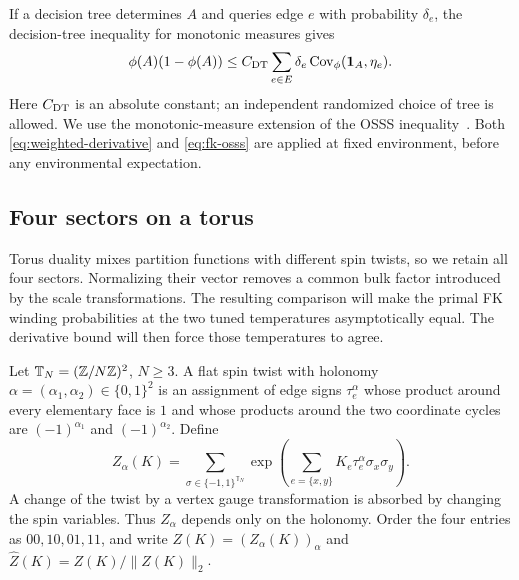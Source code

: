 If a decision tree determines $A$ and queries edge $e$ with probability
$\delta_e$, the decision-tree inequality for monotonic measures gives
\begin{equation}
 \phi(A)(1-\phi(A))
 \le C_{\rm DT}\sum_{e\in E}\delta_e\operatorname{Cov}_\phi(\mathbf 1_A,\eta_e).
 \label{eq:fk-osss}
\end{equation}
Here $C_{\rm DT}$ is an absolute constant; an independent randomized
choice of tree is allowed. We use the monotonic-measure extension
\cite[Theorem~1.1]{DCRT} of the OSSS inequality~\cite{OSSS}.
Both \eqref{eq:weighted-derivative} and \eqref{eq:fk-osss} are applied
at fixed environment, before any environmental expectation.

\subsection{Four sectors on a torus}

Torus duality mixes partition functions with different spin twists,
so we retain all four sectors. Normalizing their vector removes a
common bulk factor introduced by the scale transformations. The
resulting comparison will make the primal FK winding probabilities
at the two tuned temperatures asymptotically equal. The derivative bound will
then force those temperatures to agree.

Let $\mathbb T_N=(\mathbb Z/N\mathbb Z)^2$, $N\ge3$. A flat spin twist with
holonomy $\alpha=(\alpha_1,\alpha_2)\in\{0,1\}^2$ is an assignment
of edge signs $\tau_e^\alpha$ whose product around every elementary
face is $1$ and whose products around the two coordinate cycles are
$(-1)^{\alpha_1}$ and $(-1)^{\alpha_2}$. Define
\[
 Z_\alpha(K)=\sum_{\sigma\in\{-1,1\}^{\mathbb T_N}}
   \exp\left(\sum_{e=\{x,y\}}K_e\tau_e^\alpha\sigma_x\sigma_y\right).
\]
A change of the twist by a vertex gauge transformation is absorbed
by changing the spin variables. Thus $Z_\alpha$ depends only on the
holonomy. Order the four entries as $00,10,01,11$, and write
$Z(K)=(Z_\alpha(K))_\alpha$ and
$\widehat Z(K)=Z(K)/\|Z(K)\|_2$.

